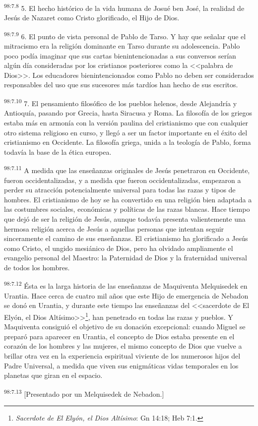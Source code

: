 \par
\textsuperscript{98:7.8} 5. El hecho histórico de la vida humana de Josué ben José, la realidad de Jesús de Nazaret como Cristo glorificado, el Hijo de Dios.

\par
\textsuperscript{98:7.9} 6. El punto de vista personal de Pablo de Tarso. Y hay que señalar que el mitracismo era la religión dominante en Tarso durante su adolescencia. Pablo poco podía imaginar que sus cartas bienintencionadas a sus conversos serían algún día consideradas por los cristianos posteriores como la <<palabra de Dios>>. Los educadores bienintencionados como Pablo no deben ser considerados responsables del uso que sus sucesores más tardíos han hecho de sus escritos.

\par
\textsuperscript{98:7.10} 7. El pensamiento filosófico de los pueblos helenos, desde Alejandría y Antioquía, pasando por Grecia, hasta Siracusa y Roma. La filosofía de los griegos estaba más en armonía con la versión paulina del cristianismo que con cualquier otro sistema religioso en curso, y llegó a ser un factor importante en el éxito del cristianismo en Occidente. La filosofía griega, unida a la teología de Pablo, forma todavía la base de la ética europea.

\par
\textsuperscript{98:7.11} A medida que las enseñanzas originales de Jesús penetraron en Occidente, fueron occidentalizadas, y a medida que fueron occidentalizadas, empezaron a perder su atracción potencialmente universal para todas las razas y tipos de hombres. El cristianismo de hoy se ha convertido en una religión bien adaptada a las costumbres sociales, económicas y políticas de las razas blancas. Hace tiempo que dejó de ser la religión de Jesús, aunque todavía presenta valientemente una hermosa religión acerca de Jesús a aquellas personas que intentan seguir sinceramente el camino de sus enseñanzas. El cristianismo ha glorificado a Jesús como Cristo, el ungido mesiánico de Dios, pero ha olvidado ampliamente el evangelio personal del Maestro: la Paternidad de Dios y la fraternidad universal de todos los hombres.

\par
\textsuperscript{98:7.12} Ésta es la larga historia de las enseñanzas de Maquiventa Melquisedek en Urantia. Hace cerca de cuatro mil años que este Hijo de emergencia de Nebadon se donó en Urantia, y durante este tiempo las enseñanzas del <<sacerdote de El Elyón, el Dios Altísimo>>\footnote{\textit{Sacerdote de El Elyón, el Dios Altísimo}: Gn 14:18; Heb 7:1.}, han penetrado en todas las razas y pueblos. Y Maquiventa consiguió el objetivo de su donación excepcional: cuando Miguel se preparó para aparecer en Urantia, el concepto de Dios estaba presente en el corazón de los hombres y las mujeres, el mismo concepto de Dios que vuelve a brillar otra vez en la experiencia espiritual viviente de los numerosos hijos del Padre Universal, a medida que viven sus enigmáticas vidas temporales en los planetas que giran en el espacio.

\par
\textsuperscript{98:7.13} [Presentado por un Melquisedek de Nebadon.]
